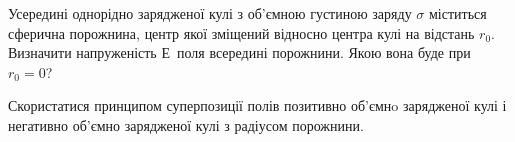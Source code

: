 \begin{problem}{8}
Усередині однорідно зарядженої кулі з об'ємною густиною заряду $\sigma$ міститься сферична порожнина, центр якої зміщений відносно центра кулі на відстань $r_0$. Визначити напруженість $Е$~поля всередині порожнини. Якою вона буде при $r_0 = 0$? 

\nb Скористатися принципом суперпозиції полів
позитивно об'ємнo зарядженої кулі і негативно об'ємно зарядженої кулі з радіусом порожнини.
\end{problem}